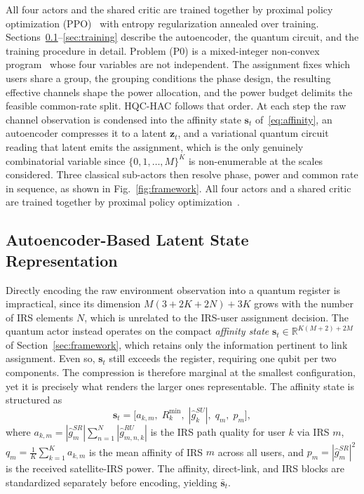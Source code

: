 \documentclass[12pt,onecolumn]{IEEEtran}
\newif\iffull
\begin{document}
All four actors and the shared critic are trained together by proximal policy optimization (PPO)~\cite{schulman2017proximal} with entropy regularization annealed over training. Sections~\ref{sec:ae}--\ref{sec:training} describe the autoencoder, the quantum circuit, and the training procedure in detail.
\else
Problem (P0) is a mixed-integer non-convex program~\cite{luo2008dynamic,luo2010semidefinite}
whose four variables are not independent. The assignment fixes which users share a group,
the grouping conditions the phase design, the resulting effective channels shape the power
allocation, and the power budget delimits the feasible common-rate split. HQC-HAC follows
that order. At each step the raw channel observation is condensed into the affinity state
$\mathbf{s}_t$ of~\eqref{eq:affinity}, an autoencoder compresses it to a latent
$\mathbf{z}_t$, and a variational quantum circuit reading that latent emits the assignment,
which is the only genuinely combinatorial variable since
$\{0,1,\ldots,M\}^K$ is non-enumerable at the scales considered. Three classical sub-actors
then resolve phase, power and common rate in sequence, as shown in
Fig.~\ref{fig:framework}. All four actors and a shared critic are trained together by
proximal policy optimization~\cite{schulman2017proximal}.
\fi

\subsection{Autoencoder-Based Latent State Representation}
\label{sec:ae}
\iffull
Directly encoding the raw environment observation into a quantum register is impractical, since its dimension $M(3+2K+2N)+3K$ grows with the number of IRS elements $N$, which is unrelated to the IRS-user assignment decision.
The quantum actor instead operates on the compact \emph{affinity state} $\mathbf{s}_t \in \mathbb{R}^{K(M+2)+2M}$ of Section~\ref{sec:framework}, which retains only the information pertinent to link assignment.
Even so, $\mathbf{s}_t$ still exceeds the register, requiring one qubit per two components.
The compression is therefore marginal at the smallest configuration, yet it is precisely what renders the larger ones representable. 
The affinity state is structured as
\begin{equation}
    \mathbf{s}_t
    =
    \bigl[
      a_{k,m}, \;
      R_k^{\min},\;
      |\hat{g}^{SU}_k|,\;
      q_m,\; p_m
    \bigr],
    \label{eq:affinity}
\end{equation}
where $a_{k,m} = |\hat{g}^{SR}_m| \sum_{n=1}^{N} |\hat{g}^{RU}_{m,n,k}|$ is the IRS path quality for user $k$ via IRS $m$, $q_m = \frac{1}{K}\sum_{k=1}^{K} a_{k,m}$ is the mean affinity of IRS $m$ across all users, and $p_m = |\hat{g}^{SR}_m|^2$ is the received satellite-IRS power.
The affinity, direct-link, and IRS blocks are standardized separately before encoding, yielding $\bar{\mathbf{s}}_t$.
\end{document}
